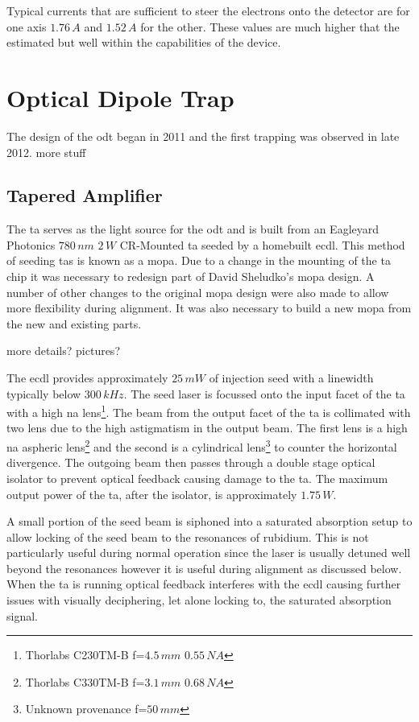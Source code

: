 Typical currents that are sufficient to steer the electrons onto the detector are for one axis $1.76\,\unit{A}$ and $1.52\,\unit{A}$ for the other. These values are much higher that the estimated but well within the capabilities of the device.

\section{Optical Dipole Trap}

The design of the \gls{odt} began in 2011 and the first trapping was observed in late 2012.
{\color{red} more stuff}

\subsection{Tapered Amplifier}
The \gls{ta} serves as the light source for the \gls{odt} and is built from an Eagleyard Photonics $780\,\unit{nm}$ $2\,\unit{W}$ CR-Mounted \gls{ta} seeded by a homebuilt \gls{ecdl}. This method of seeding \glspl{ta} is known as a \gls{mopa}\cite{wilson_narrow-linewidth_1998}. Due to a change in the mounting of the \gls{ta} chip it was necessary to redesign part of David Sheludko's \gls{mopa} design\cite{sheludko_shaped_2010}. A number of other changes to the original \gls{mopa} design were also made to allow more flexibility during alignment. It was also necessary to build a new \gls{mopa} from the new and existing parts.

{\color{red} more details? pictures?}

The \gls{ecdl} provides approximately $25\,\unit{mW}$ of injection seed with a linewidth typically below $300\,\unit{kHz}$. The seed laser is focussed onto the input facet of the \gls{ta} with a high \gls{na} lens\footnote{Thorlabs C230TM-B f=$4.5\,\unit{mm}$ $0.55\,\unit{NA}$}. The beam from the output facet of the \gls{ta} is collimated with two lens due to the high astigmatism in the output beam. The first lens is a high \gls{na} aspheric lens\footnote{Thorlabs C330TM-B f=$3.1\,\unit{mm}$ $0.68\,\unit{NA}$} and the second is a cylindrical lens\footnote{Unknown provenance f=$50\,\unit{mm}$} to counter the horizontal divergence. The outgoing beam then passes through a double stage optical isolator to prevent optical feedback causing damage to the \gls{ta}. The maximum output power of the \gls{ta}, after the isolator, is approximately $1.75\,\unit{W}$.

A small portion of the seed beam is siphoned into a saturated absorption setup\cite{maguire_theoretical_2006, haroche_theory_1972, preston_doppler-free_1996} to allow locking of the seed beam to the resonances of rubidium. This is not particularly useful during normal operation since the laser is usually detuned well beyond the resonances however it is useful during alignment as discussed below. When the \gls{ta} is running optical feedback interferes with the \gls{ecdl} causing further issues with visually deciphering, let alone locking to, the saturated absorption signal.

